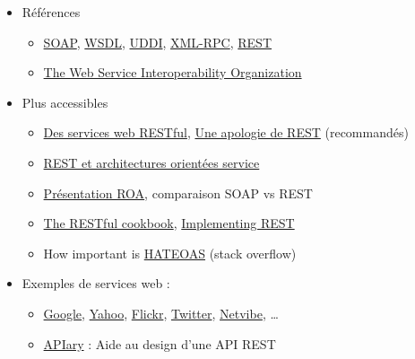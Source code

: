 \begin{itemize}
\tightlist
\item
  Références

  \begin{itemize}
  \tightlist
  \item
    \href{https://www.w3.org/TR/soap/}{SOAP},
    \href{https://www.w3.org/2002/ws/desc/}{WSDL},
    \href{http://uddi.xml.org/}{UDDI},
    \href{http://xmlrpc.scripting.com/default.html}{XML-RPC},
    \href{http://www.ics.uci.edu/~fielding/pubs/dissertation/top.htm}{REST}
  \item
    \href{http://www.oasis-ws-i.org/}{The Web Service Interoperability
    Organization}
  \end{itemize}
\item
  Plus accessibles

  \begin{itemize}
  \tightlist
  \item
    \href{https://larlet.fr/david/biologeek/archives/20070629-architecture-orientee-ressource-pour-faire-des-services-web-restful/}{Des
    services web RESTful},
    \href{https://web.archive.org/web/20160310205502/http://home.ccil.org/~cowan/restws.pdf}{Une
    apologie de REST} (recommandés)
  \item
    \href{http://www.figer.com/Publications/SOA.htm}{REST et
    architectures orientées service}
  \item
    \href{http://fr.slideshare.net/samijaber/symposium-dng-2008-roa}{Présentation
    ROA}, comparaison SOAP vs REST
  \item
    \href{http://restcookbook.com/}{The RESTful cookbook},
    \href{https://code.google.com/archive/p/implementing-rest/wikis}{Implementing
    REST}
  \item
    How important is
    \href{http://stackoverflow.com/questions/20335967/how-useful-important-is-rest-hateoas-maturity-level-3}{HATEOAS}
    (stack overflow)
  \end{itemize}
\item
  Exemples de services web :

  \begin{itemize}
  \tightlist
  \item
    \href{https://developers.google.com/products/}{Google},
    \href{https://developer.yahoo.com/everything.html}{Yahoo},
    \href{https://www.flickr.com/services/api/}{Flickr},
    \href{https://dev.twitter.com/overview/api}{Twitter},
    \href{http://uwa.netvibes.com/docs/Uwa/html/index.html}{Netvibe},
    \ldots{}
  \item
    \href{https://apiary.io/}{APIary} : Aide au design d'une API REST
  \end{itemize}
\end{itemize}

